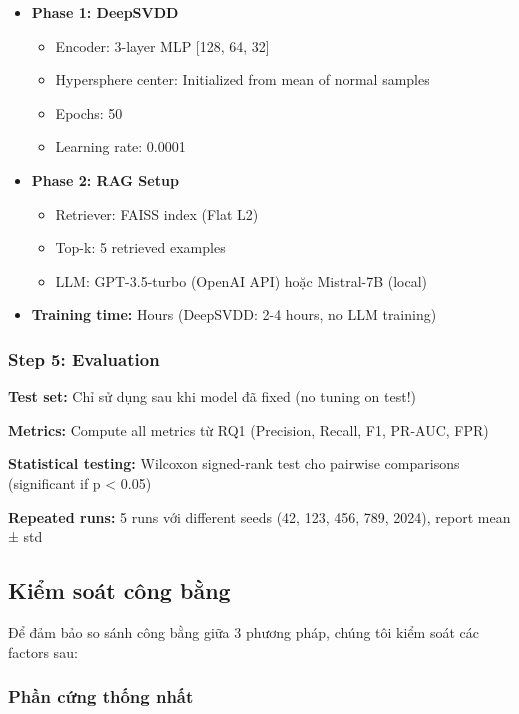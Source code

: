 \begin{itemize}
    \item \textbf{Phase 1: DeepSVDD}
        \begin{itemize}
            \item Encoder: 3-layer MLP [128, 64, 32]
            \item Hypersphere center: Initialized from mean of normal samples
            \item Epochs: 50
            \item Learning rate: 0.0001
        \end{itemize}
    \item \textbf{Phase 2: RAG Setup}
        \begin{itemize}
            \item Retriever: FAISS index (Flat L2)
            \item Top-k: 5 retrieved examples
            \item LLM: GPT-3.5-turbo (OpenAI API) hoặc Mistral-7B (local)
        \end{itemize}
    \item \textbf{Training time:} Hours (DeepSVDD: 2-4 hours, no LLM training)
\end{itemize}

\subsubsection{Step 5: Evaluation}

\textbf{Test set:} Chỉ sử dụng sau khi model đã fixed (no tuning on test!)

\textbf{Metrics:} Compute all metrics từ RQ1 (Precision, Recall, F1, PR-AUC, FPR)

\textbf{Statistical testing:} Wilcoxon signed-rank test cho pairwise comparisons (significant if p < 0.05)

\textbf{Repeated runs:} 5 runs với different seeds (42, 123, 456, 789, 2024), report mean ± std

\subsection{Kiểm soát công bằng}
\label{subsec:fairness-controls}

Để đảm bảo so sánh công bằng giữa 3 phương pháp, chúng tôi kiểm soát các factors sau:

\subsubsection{Phần cứng thống nhất}

